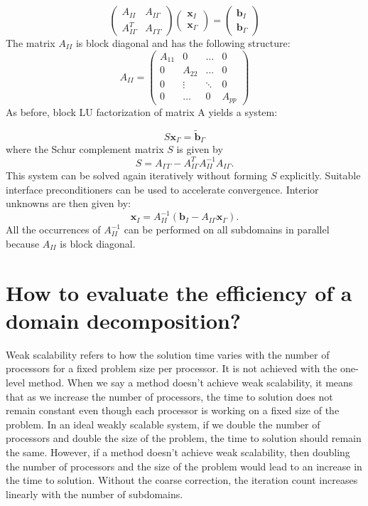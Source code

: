 \documentclass[11pt]{book}
\begin{document}
$$\left(\begin{array}{cc}A_{I I} & A_{I \Gamma} \\A_{I  \Gamma}^{T} & A_{\Gamma \Gamma}\end{array}\right)\left(\begin{array}{l}\mathbf{x}_{I} \\\mathbf{x}_{\Gamma}\end{array}\right)=\left(\begin{array}{l}\mathbf{b}_{I} \\\mathbf{b}_{\Gamma}\end{array}\right)$$ 
The matrix $A_{I I}$ is block diagonal and has the following structure: $$A_{I I}=\left(\begin{array}{cccc}A_{11} & 0 & \ldots & 0 \\0 & A_{22} & \ldots & 0 \\0 & \vdots & \ddots & 0 \\0 & \ldots & 0 & A_{p p}\end{array}\right)$$ As before, block LU factorization of matrix A yields a system:

$$S \mathbf{x}_{\Gamma}=\widetilde{\mathbf{b}}_{\Gamma}$$ where the Schur complement matrix $S$ is given by $$S=A_{\Gamma \Gamma}-A_{I \Gamma}^{T} A_{I I}^{-1} A_{I \Gamma}.$$
This system can be solved again iteratively without forming $S$ explicitly. Suitable interface preconditioners can be used to accelerate convergence. Interior unknowns are then given by:
$$\mathbf{x}_{I}=A_{I I}^{-1}\left(\mathbf{b}_{I}-A_{I \Gamma} \mathbf{x}_{\Gamma}\right).$$
All the occurrences of $A_{I I}^{-1}$ can be performed on all subdomains in parallel because $A_{I I}$ is block diagonal.

\section*{How to evaluate the efficiency of a domain decomposition?}

Weak scalability refers to how the solution time varies with the number of processors for a fixed problem size per processor. It is not achieved with the one-level method. When we say a method doesn’t achieve weak scalability, it means that as we increase the number of processors, the time to solution does not remain constant even though each processor is working on a fixed size of the problem.
In an ideal weakly scalable system, if we double the number of processors and double the size of the problem, the time to solution should remain the same. However, if a method doesn’t achieve weak scalability, then doubling the number of processors and the size of the problem would lead to an increase in the time to solution. Without the coarse correction, the iteration count increases linearly with the number of subdomains. 
\end{document}

